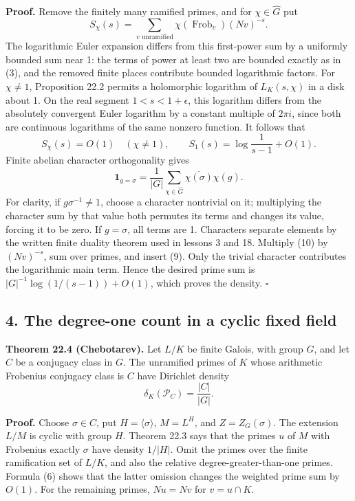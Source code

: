 \documentclass[11pt,a4paper]{article}
\begin{document}
\textbf{Proof.} Remove the finitely many ramified primes, and for
\(\chi\in\widehat G\) put \[
S_\chi(s)=\sum_{v\text{ unramified}}\chi(\operatorname{Frob}_v)(Nv)^{-s}.
\tag{8}
\] The logarithmic Euler expansion differs from this first-power sum by
a uniformly bounded sum near 1: the terms of power at least two are
bounded exactly as in (3), and the removed finite places contribute
bounded logarithmic factors. For \(\chi\ne1\), Proposition 22.2 permits
a holomorphic logarithm of \(L_K(s,\chi)\) in a disk about 1. On the
real segment \(1<s<1+\epsilon\), this logarithm differs from the
absolutely convergent Euler logarithm by a constant multiple of
\(2\pi i\), since both are continuous logarithms of the same nonzero
function. It follows that \[
S_\chi(s)=O(1)\quad(\chi\ne1),\qquad
S_1(s)=\log\frac1{s-1}+O(1).
\tag{9}
\] Finite abelian character orthogonality gives \[
\mathbf1_{g=\sigma}=\frac1{|G|}\sum_{\chi\in\widehat G}
\overline{\chi(\sigma)}\chi(g).
\tag{10}
\] For clarity, if \(g\sigma^{-1}\ne1\), choose a character nontrivial
on it; multiplying the character sum by that value both permutes its
terms and changes its value, forcing it to be zero. If \(g=\sigma\), all
terms are 1. Characters separate elements by the written finite duality
theorem used in lessons 3 and 18. Multiply (10) by \((Nv)^{-s}\), sum
over primes, and insert (9). Only the trivial character contributes the
logarithmic main term. Hence the desired prime sum is
\(|G|^{-1}\log(1/(s-1))+O(1)\), which proves the density. \(\square\)

\subsection{4. The degree-one count in a cyclic fixed
field}\label{the-degree-one-count-in-a-cyclic-fixed-field}

\textbf{Theorem 22.4 (Chebotarev).} Let \(L/K\) be finite Galois, with
group \(G\), and let \(C\) be a conjugacy class in \(G\). The unramified
primes of \(K\) whose arithmetic Frobenius conjugacy class is \(C\) have
Dirichlet density \[
\delta_K(\mathcal P_C)=\frac{|C|}{|G|}.
\tag{11}
\]

\textbf{Proof.} Choose \(\sigma\in C\), put \(H=\langle\sigma\rangle\),
\(M=L^H\), and \(Z=Z_G(\sigma)\). The extension \(L/M\) is cyclic with
group \(H\). Theorem 22.3 says that the primes \(u\) of \(M\) with
Frobenius exactly \(\sigma\) have density \(1/|H|\). Omit the primes
over the finite ramification set of \(L/K\), and also the relative
degree-greater-than-one primes. Formula (6) shows that the latter
omission changes the weighted prime sum by \(O(1)\). For the remaining
primes, \(Nu=Nv\) for \(v=u\cap K\).
\end{document}
